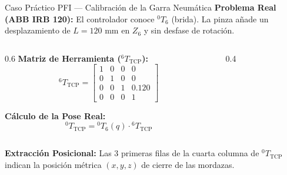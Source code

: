 \documentclass[aspectratio=169]{beamer}
\begin{document}
\begin{frame}{Caso Práctico PFI — Calibración de la Garra Neumática}
    \textbf{Problema Real (ABB IRB 120):} El controlador conoce $^{0}T_6$ (brida). La pinza añade un desplazamiento de $L = 120\text{ mm}$ en $Z_6$ y sin desfase de rotación.
    
    \vspace{0.2cm}
    \begin{columns}
        \begin{column}{0.6\textwidth}
            \textbf{Matriz de Herramienta ($^{6}T_{\text{TCP}}$):}
            \begin{equation*}
                ^{6}T_{\text{TCP}} = \begin{bmatrix} 
                1 & 0 & 0 & 0 \\ 
                0 & 1 & 0 & 0 \\ 
                0 & 0 & 1 & 0.120 \\ 
                0 & 0 & 0 & 1 
                \end{bmatrix}
            \end{equation*}
            
            \textbf{Cálculo de la Pose Real:}
            \begin{equation*}
                ^{0}T_{\text{TCP}} = {}^{0}T_6(q) \cdot {}^{6}T_{\text{TCP}}
            \end{equation*}
        \end{column}
        \begin{column}{0.4\textwidth}
            \centering
        \end{column}
    \end{columns}
    
    \vspace{0.3cm}
    \small \textbf{Extracción Posicional:} Las 3 primeras filas de la cuarta columna de $^{0}T_{\text{TCP}}$ indican la posición métrica $(x,y,z)$ de cierre de las mordazas.
\end{frame}
\end{document}
